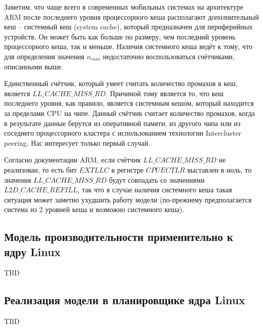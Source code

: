     Заметим, что чаще всего в современных мобильных системах на архитектуре ARM после последнего
    уровня процессорного кеша располагают дополнительный кеш -- системный кеш (system cache),
    который предназначен для периферийных устройств. Он может быть как больше по размеру, чем
    последний уровень процессорного кеша, так и меньше. Наличия системного кеша ведёт к тому,
    что для определения значения $n_{ram}$ недостаточно воспользоваться счётчиками, описанными
    выше.

    Единственный счётчик, который умеет считать количество промахов в кеш, является
    $LL\_CACHE\_MISS\_RD$. Причиной тому является то, что кеш последнего уровня, как правило,
    является системным кешом, который находится за пределами CPU на чипе. Данный счётчик считает
    количество промахов, когда в результате данные берутся из оперативной памяти,
    из другого чипа или из соседнего процессорного кластера с использованием технологии
    Intercluster peering. Нас интересует только первый случай.

    Согласно документации ARM, если счётчик $LL\_CACHE\_MISS\_RD$ не реализован, то есть
    бит $EXTLLC$ в регистре $CPUECTLR$ выставлен в ноль, то значения $LL\_CACHE\_MISS\_RD$
    будут совпадать со значениями $L2D\_CACHE\_REFILL$, так что в случае наличия
    системного кеша такая ситуация может заметно ухудшить работу модели
    (по-прежнему предполагается система из 2 уровней кеша и возможно системного кеша).

\subsection{Модель производительности применительно к ядру Linux}

    TBD

\subsection{Реализация модели в планировщике ядра Linux}

    TBD

\newpage
